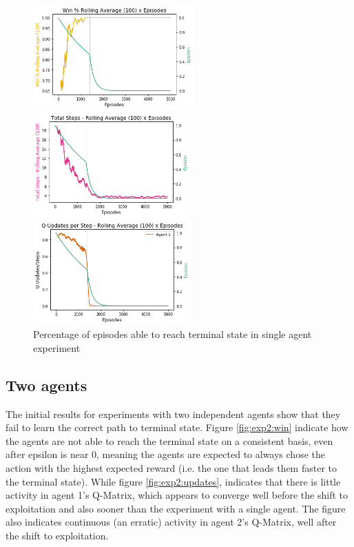 \documentclass[10pt]{article}
\begin{document}
        \begin{figure}[h]
            \centering
            \begin{minipage}{0.3\textwidth}
                \includegraphics[height=4cm]{Images/exp_1/1_win_percent.png}
            \end{minipage}
            \hfill
            \begin{minipage}{0.3\textwidth}
                \includegraphics[height=4cm]{Images/exp_1/2_total_steps.png}
            \end{minipage}
            \hfill
            \begin{minipage}{0.3\textwidth}
                \includegraphics[height=4cm]{Images/exp_1/3_updates_per_step.png}
            \end{minipage}
            \caption{Percentage of episodes able to reach terminal state in single agent experiment}
            \label{fig:exp1:win}
        \end{figure}

    \subsection{Two agents}
        The initial results for experiments with two independent agents show that they fail to learn the correct path to terminal state. Figure \ref{fig:exp2:win} indicate how the agents are not able to reach the terminal state on a consistent basis, even after epsilon is near 0, meaning the agents are expected to always chose the action with the highest expected reward (i.e. the one that leads them faster to the terminal state). While figure \ref{fig:exp2:updates}, indicates that  there is little activity in agent 1's Q-Matrix, which appears to converge well before the shift to exploitation and also sooner than the experiment with a single agent. The figure also indicates continuous (an erratic) activity in agent 2's Q-Matrix, well after the shift to exploitation.
\end{document}
